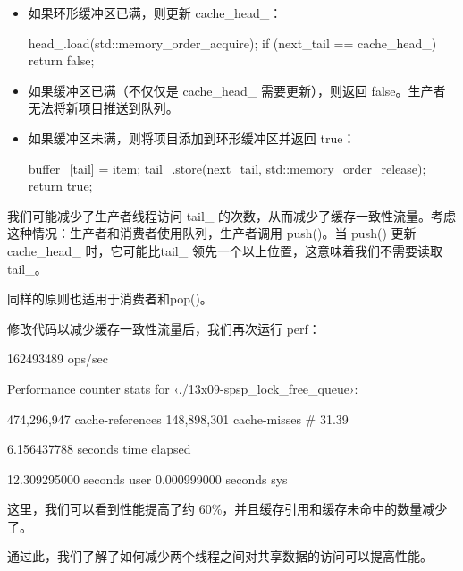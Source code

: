 \begin{itemize}
\item
如果环形缓冲区已满，则更新 cache\_head\_：

\begin{cpp}
head_.load(std::memory_order_acquire);
        if (next_tail == cache_head_) {
            return false;
        }
\end{cpp}

\item
如果缓冲区已满（不仅仅是 cache\_head\_ 需要更新），则返回 false。生产者无法将新项目推送到队列。

\item
如果缓冲区未满，则将项目添加到环形缓冲区并返回 true：

\begin{cpp}
buffer_[tail] = item;
    tail_.store(next_tail, std::memory_order_release);
    return true;
\end{cpp}
\end{itemize}

我们可能减少了生产者线程访问 tail\_ 的次数，从而减少了缓存一致性流量。考虑这种情况：生产者和消费者使用队列，生产者调用 push()。当 push() 更新 cache\_head\_ 时，它可能比tail\_ 领先一个以上位置，这意味着我们不需要读取 tail\_。

同样的原则也适用于消费者和pop()。

修改代码以减少缓存一致性流量后，我们再次运行 perf：

\begin{shell}
162493489 ops/sec

  Performance counter stats for ‹./13x09-spsp_lock_free_queue›:

        474,296,947     cache-references
        148,898,301     cache-misses           # 31.39%

        6.156437788 seconds time elapsed

       12.309295000 seconds user
        0.000999000 seconds sys
\end{shell}

这里，我们可以看到性能提高了约 60\%，并且缓存引用和缓存未命中的数量减少了。

通过此，我们了解了如何减少两个线程之间对共享数据的访问可以提高性能。




























